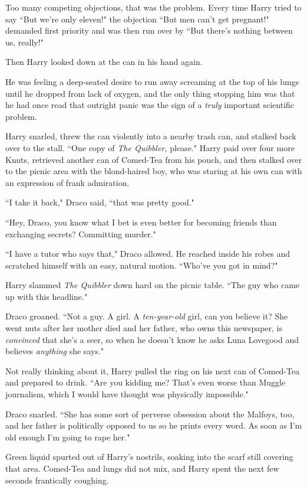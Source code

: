 Too many competing objections, that was the problem. Every time Harry tried to say ``But we're only eleven!" the objection ``But men can't get pregnant!" demanded first priority and was then run over by ``But there's nothing between us, really!"

Then Harry looked down at the can in his hand again.

He was feeling a deep-seated desire to run away screaming at the top of his lungs until he dropped from lack of oxygen, and the only thing stopping him was that he had once read that outright panic was the sign of a \emph{truly} important scientific problem.

Harry snarled, threw the can violently into a nearby trash can, and stalked back over to the stall. ``One copy of \emph{The Quibbler,} please." Harry paid over four more Knuts, retrieved another can of Comed-Tea from his pouch, and then stalked over to the picnic area with the blond-haired boy, who was staring at his own can with an expression of frank admiration.

``I take it back," Draco said, ``that was pretty good."

``Hey, Draco, you know what I bet is even better for becoming friends than exchanging secrets? Committing murder."

``I have a tutor who says that," Draco allowed. He reached inside his robes and scratched himself with an easy, natural motion. ``Who've you got in mind?"

Harry slammed \emph{The Quibbler} down hard on the picnic table. ``The guy who came up with this headline."

Draco groaned. ``Not a guy. A girl. A \emph{ten-year-old} girl, can you believe it? She went nuts after her mother died and her father, who owns this newspaper, is \emph{convinced} that she's a seer, so when he doesn't know he asks Luna Lovegood and believes \emph{anything} she says."

Not really thinking about it, Harry pulled the ring on his next can of Comed-Tea and prepared to drink. ``Are you kidding me? That's even worse than Muggle journalism, which I would have thought was physically impossible."

Draco snarled. ``She has some sort of perverse obsession about the Malfoys, too, and her father is politically opposed to us so he prints every word. As soon as I'm old enough I'm going to rape her."

Green liquid spurted out of Harry's nostrils, soaking into the scarf still covering that area. Comed-Tea and lungs did not mix, and Harry spent the next few seconds frantically coughing.

